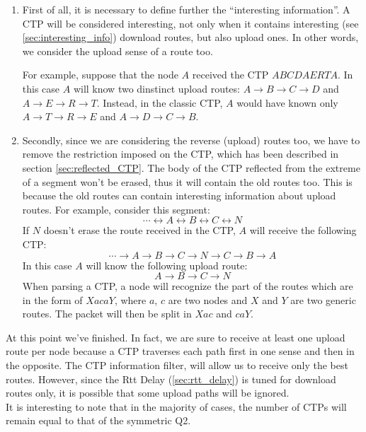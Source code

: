\documentclass[a4paper]{article}
\begin{document}
\begin{enumerate}
	\item	First of all, it is necessary to define further the ``interesting
		information''. A CTP will be considered interesting, not only when it contains
		interesting (see \ref{sec:interesting_info}) download routes, but also upload
		ones. In other words, we consider the upload sense of a route too. 

		For example, suppose that the node $A$ received the CTP $ABCDAERTA$. In this
		case $A$ will know two dinstinct upload routes: $A\rightarrow B\rightarrow
		C\rightarrow D$ and $A\rightarrow E\rightarrow R\rightarrow T$. Instead, in
		the classic CTP, $A$ would have known only $A\rightarrow T\rightarrow
		R\rightarrow E$ and $A\rightarrow D\rightarrow C\rightarrow B$.
	\item Secondly, since we are considering the reverse (upload) routes
		too, we have to remove the restriction imposed on the CTP,
		which has been described in section \ref{sec:reflected_CTP}.
                The body of the CTP reflected from the extreme of a segment
                won't be erased, thus it will contain the old routes too.
		This is because the old routes can contain interesting
		information about upload routes.
		For example, consider this segment:
		\[ \cdots \leftrightarrow A \leftrightarrow B \leftrightarrow C \leftrightarrow N \]
		If $N$ doesn't erase the route received in the CTP, $A$ will
		receive the following CTP:
		\[
		\cdots \rightarrow A \rightarrow B \rightarrow C \rightarrow N \rightarrow C \rightarrow B \rightarrow A
		\]
		In this case $A$ will know the following upload route:
		\[
			A \rightarrow B \rightarrow C \rightarrow N
		\]
		When parsing a CTP, a node will recognize the part of the
		routes which are in the form of $XacaY$, where $a$, $c$ are
		two nodes and $X$ and $Y$ are two generic routes. The packet
		will then be split in $Xac$ and $caY$.
\end{enumerate}
At this point we've finished. In fact, we are sure to receive at least one
upload route per node because a CTP traverses each path first in one sense
and then in the opposite. The CTP information filter, will allow us
to receive only the best routes. However, since the Rtt Delay
(\ref{sec:rtt_delay}) is tuned for download routes only, it is possible that
some upload paths will be ignored.\\
It is interesting to note that in the majority of cases, the number of
CTPs will remain equal to that of the symmetric Q2.
\end{document}
